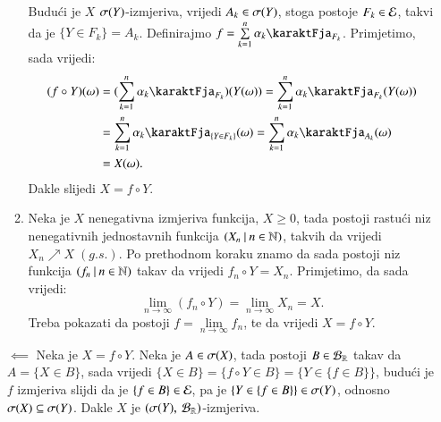 \begin{rj}[\ref{zad:3.20}]
\begin{itemize}
\begin{enumerate}[label=(\arabic*. korak)]
            Budu\' ci je $X$ $\sigma({Y})$-izmjeriva, vrijedi $A_k \in \sigma({Y})$, stoga postoje $F_k \in \mathcal{E}$, takvi da je $\{Y \in F_k\} = A_k$.
            Definirajmo $f = \suma{k = 1}{n} \alpha_k \karaktFja_{F_k}$.
            Primjetimo, sada vrijedi:
            \begin{equation*}
                \begin{aligned}
                    (f \circ Y)(\omega) &= (\suma{k = 1}{n} \alpha_k \karaktFja_{F_k})(Y(\omega)) = \suma{k = 1}{n} \alpha_k \karaktFja_{F_k} (Y(\omega))\\
                    &= \suma{k = 1}{n} \alpha_k \karaktFja_{\{Y \in F_k\}} (\omega) = \suma{k = 1}{n} \alpha_k \karaktFja_{A_k} (\omega)\\
                    &= X (\omega).
                \end{aligned}
            \end{equation*}
            Dakle slijedi $X = f \circ Y$.
            \item Neka je $X$ nenegativna izmjeriva funkcija, $X \geq 0$, tada postoji rastu\' ci niz nenegativnih jednostavnih funkcija $({X_n} \: | \: {n \in \mathbb{N}})$, takvih da vrijedi $X_n \nearrow X \; (g.s.)$.
            Po prethodnom koraku znamo da sada postoji niz funkcija $({f_n} \: | \: {n \in \mathbb{N}})$ takav da vrijedi $f_n \circ Y = X_n$.
            Primjetimo, da sada vrijedi:
            \begin{equation*}
                \lim\limits_{n \to \infty} (f_n \circ Y) = \lim\limits_{n \to \infty} X_n = X.
            \end{equation*}
            Treba pokazati da postoji $f = \lim\limits_{n \to \infty} f_n$, te da vrijedi $X = f \circ Y$.
        \end{enumerate}
        
        \item[$\impliedby$]
        Neka je $X = f \circ Y$. Neka je $A \in \sigma({X})$, tada postoji $B \in \mathcal{B}_{\mathbb{R}}$ takav da $A = \{ X \in B\}$, sada vrijedi $\{  X \in B \} = \{ f \circ Y \in B \} = \{ Y \in \{ f \in B \} \}$, budu\' ci je $f$ izmjeriva slijdi da je $\{f \in B\} \in \mathcal{E}$, pa je $\{Y \in \{ f \in B \}\} \in \sigma({Y})$, odnosno $\sigma({X}) \subseteq \sigma({Y})$.
        Dakle $X$ je $({\sigma({Y})}, \: {\mathcal{B}_{\mathbb{R}}})$-izmjeriva.
    \end{itemize}
\end{rj}